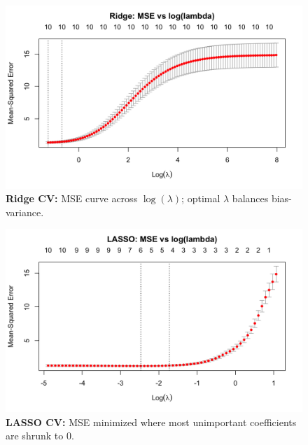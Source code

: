 \documentclass[10pt, landscape]{article}
\begin{document}
\begin{multicols}{3}
\begin{figure}[H]
\centering
\includegraphics[width=0.95\linewidth]{Ridge MSE.png}
\vspace{-0.5em}
\caption*{\scriptsize \textbf{Ridge CV:} MSE curve across \(\log(\lambda)\); optimal \(\lambda\) balances bias-variance.}
\end{figure}

\begin{figure}[H]
\centering
\includegraphics[width=0.95\linewidth]{Lasso MSE.png}
\vspace{-0.5em}
\caption*{\scriptsize \textbf{LASSO CV:} MSE minimized where most unimportant coefficients are shrunk to 0.}
\end{figure}


\end{multicols}
\end{document}
